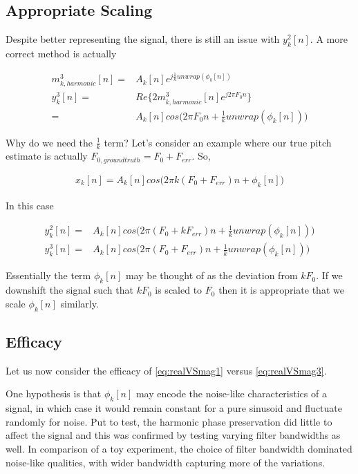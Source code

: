 \documentclass [11pt, proquest] {uwthesis}[2015/03/03]
\begin{document}
\subsection{Appropriate Scaling}

Despite better representing the signal, there is still an issue with $y_k^2[n]$.  A more correct method is actually

\begin{align}
\label{eq:realVSmag3}
m^3_{k,harmonic}[n] =& A_k[n]e^{j\frac{1}{k} unwrap(\phi_k[n])} \\
y_k^3[n] =& Re\{ 2 m^3_{k,harmonic}[n] e^{j2\pi F_0 n} \}  \\
=& A_k[n]cos\Big(2\pi F_0 n + \frac{1}{k}unwrap(\phi_k[n])\Big) \nonumber
\end{align}


Why do we need the $\frac{1}{k}$ term?  Let's consider an example where our true pitch estimate is actually $F_{0,ground truth} = F_0 + F_{err}$.  So,

\begin{align}
x_k[n] = A_k[n]cos\Big(2\pi k(F_0 + F_{err})n + \phi_k[n]\Big)
\end{align}

In this case

\begin{align}
y_k^2[n] =& A_k[n]cos\Big(2\pi (F_0 + kF_{err})n + \frac{1}{k}unwrap(\phi_k[n])\Big) \\
y_k^3[n] =& A_k[n]cos\Big(2\pi (F_0 + F_{err})n + \frac{1}{k}unwrap(\phi_k[n])\Big)
\end{align}

Essentially the term $\phi_k[n]$ may be thought of as the deviation from $kF_0$.  If we downshift the signal such that $kF_0$ is scaled to $F_0$ then it is appropriate that we scale $\phi_k[n]$ similarly.

\subsection{Efficacy}

Let us now consider the efficacy of \ref{eq:realVSmag1} versus  \ref{eq:realVSmag3}.

One hypothesis is that $\phi_k[n]$ may encode the noise-like characteristics of a signal, in which case it would remain constant for a pure sinusoid and fluctuate randomly for noise.  Put to test, the harmonic phase preservation did little to affect the signal and this was confirmed by testing varying filter bandwidths as well.  In comparison of a toy experiment, the choice of filter bandwidth dominated noise-like qualities, with wider bandwidth capturing more of the variations.
\end{document}
